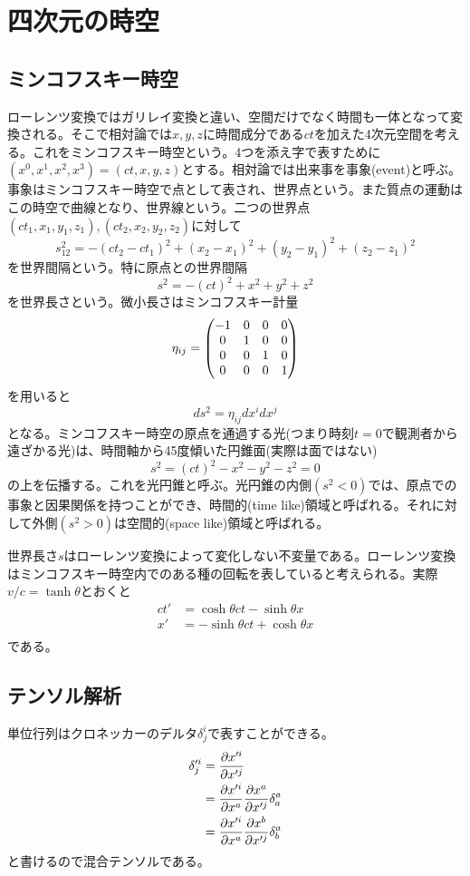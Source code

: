 \section{四次元の時空}

\subsection{ミンコフスキー時空}
    ローレンツ変換ではガリレイ変換と違い、空間だけでなく時間も一体となって変換される。そこで相対論では$x,y,z$に時間成分である$ct$を加えた4次元空間を考える。これをミンコフスキー時空という。4つを添え字で表すために$(x^0,x^1,x^2,x^3) = (ct,x,y,z)$とする。相対論では出来事を事象(event)と呼ぶ。事象はミンコフスキー時空で点として表され、世界点という。また質点の運動はこの時空で曲線となり、世界線という。二つの世界点$(ct_1,x_1,y_1,z_1),(ct_2,x_2,y_2,z_2)$に対して
        \[s_{12}^2 = -(ct_2 - ct_1)^2 + (x_2 - x_1)^2 + (y_2 - y_1)^2 + (z_2 - z_1)^2\]
    を世界間隔という。特に原点との世界間隔
        \[s^2 = -(ct)^2 + x^2 + y^2 + z^2\]
    を世界長さという。微小長さはミンコフスキー計量
        \[\eta_{ij} = \pmat{
            -1 & 0 & 0 & 0\\
            0 & 1 & 0 & 0\\
            0 & 0 & 1 & 0\\
            0 & 0 & 0 & 1
        }\]
    を用いると
        \[ds^2 = \eta_{ij}dx^idx^j\]
    となる。ミンコフスキー時空の原点を通過する光(つまり時刻$t = 0$で観測者から遠ざかる光)は、時間軸から45度傾いた円錐面(実際は面ではない)
        \[s^2 = (ct)^2 - x^2 - y^2 - z^2 = 0\]
    の上を伝播する。これを光円錐と呼ぶ。光円錐の内側$(s^2 < 0)$では、原点での事象と因果関係を持つことができ、時間的(time like)領域と呼ばれる。それに対して外側$(s^2 > 0)$は空間的(space like)領域と呼ばれる。

    世界長さ$s$はローレンツ変換によって変化しない不変量である。ローレンツ変換はミンコフスキー時空内でのある種の回転を表していると考えられる。実際$v/c = \tanh\theta$とおくと
    \begin{align*}
        ct' &= \cosh\theta ct - \sinh\theta x\\
        x' &= -\sinh\theta ct + \cosh\theta x\\
    \end{align*}
    である。

\subsection{テンソル解析}
    単位行列はクロネッカーのデルタ$\delta^i_j$で表すことができる。
    \begin{align*}
        \delta'^i_j &= \pd[x'^i]{x'^j}\\
        &= \pd[x'^i]{x^a}\pd[x^a]{x'^j}\delta^a_a\\
        &= \pd[x'^i]{x^a}\pd[x^b]{x'^j}\delta^a_b
    \end{align*}
    と書けるので混合テンソルである。

